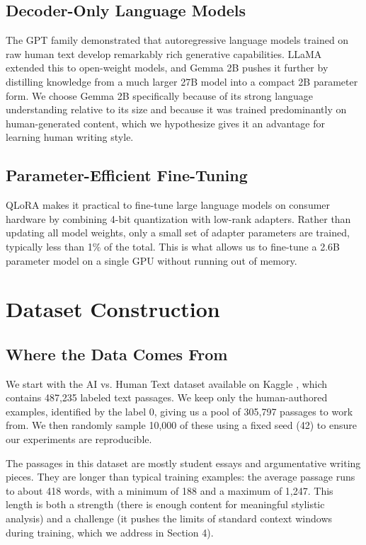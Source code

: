 \documentclass{article}
\begin{document}
\subsection{Decoder-Only Language Models}

The GPT family \cite{radford2019language} demonstrated that autoregressive language models trained on raw human text develop remarkably rich generative capabilities. LLaMA \cite{touvron2023llama} extended this to open-weight models, and Gemma 2B \cite{google2024gemma} pushes it further by distilling knowledge from a much larger 27B model into a compact 2B parameter form. We choose Gemma 2B specifically because of its strong language understanding relative to its size and because it was trained predominantly on human-generated content, which we hypothesize gives it an advantage for learning human writing style.

\subsection{Parameter-Efficient Fine-Tuning}

QLoRA \cite{dettmers2023qlora} makes it practical to fine-tune large language models on consumer hardware by combining 4-bit quantization with low-rank adapters. Rather than updating all model weights, only a small set of adapter parameters are trained, typically less than 1\% of the total. This is what allows us to fine-tune a 2.6B parameter model on a single GPU without running out of memory.

\section{Dataset Construction}

\subsection{Where the Data Comes From}

We start with the AI vs. Human Text dataset available on Kaggle \cite{kaggle_aivshuman}, which contains 487,235 labeled text passages. We keep only the human-authored examples, identified by the label 0, giving us a pool of 305,797 passages to work from. We then randomly sample 10,000 of these using a fixed seed (42) to ensure our experiments are reproducible.

The passages in this dataset are mostly student essays and argumentative writing pieces. They are longer than typical training examples: the average passage runs to about 418 words, with a minimum of 188 and a maximum of 1,247. This length is both a strength (there is enough content for meaningful stylistic analysis) and a challenge (it pushes the limits of standard context windows during training, which we address in Section 4).
\end{document}
